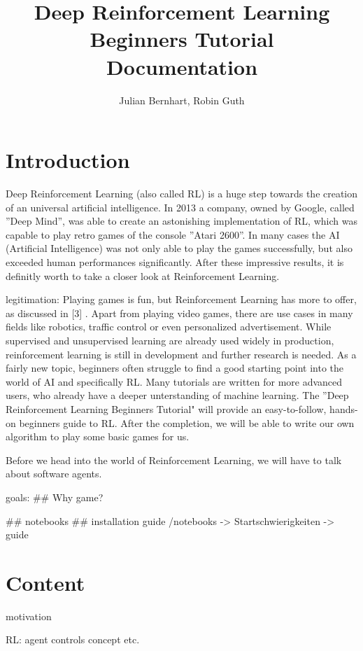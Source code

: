 \documentclass[a4paper]{article}
\title{Deep Reinforcement Learning Beginners Tutorial \\Documentation}
\author{Julian Bernhart, Robin Guth}
\begin{document}
	
	\maketitle
	\tableofcontents
	
	\section{Introduction}
	
		 Deep Reinforcement Learning (also called RL) is a huge step towards the creation of an universal artificial intelligence. In 2013 a company, owned by Google, called ''Deep Mind'', was able to create an astonishing implementation of RL, which was capable to play retro games of the console ''Atari 2600''. In many cases the AI (Artificial Intelligence) was not only able to play the games successfully, but also exceeded human performances significantly. After these impressive results, it is definitly worth to take a closer look at Reinforcement Learning.
	
	legitimation:	 
		 Playing games is fun, but Reinforcement Learning has more to offer, as discussed in [3] . Apart from playing video games, there are use cases in many fields like robotics, traffic control or even personalized advertisement. While supervised and unsupervised learning are already used widely in production, reinforcement learning is still in development and further research is needed. As a fairly new topic, beginners often struggle to find a good starting point into the world of AI and specifically RL. Many tutorials are written for more advanced users, who already have a deeper unterstanding of machine learning. The ''Deep Reinforcement Learning Beginners Tutorial" will provide an easy-to-follow, hands-on beginners guide to RL. After the completion, we will be able to write our own algorithm to play some basic games for us.
		 
		 Before we head into the world of Reinforcement Learning, we will have to talk about software agents.
	
	goals:
		 ## Why game?
		 
		 ## notebooks
		 ## installation guide /notebooks -> Startschwierigkeiten -> guide
		 

	\section{Content}
	motivation	
	
	RL:
		agent controls
		concept etc.
\end{document}
